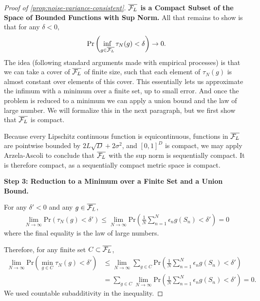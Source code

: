 \begin{proof}[Proof of \cref{prop:noise-variance-consistent}]
\textbf{$\overline{\mathcal{F}_L}$ is a Compact Subset of the Space of Bounded Functions with Sup Norm.}
All that remains to show is that for any $\delta < 0$,
\begin{align}
    \mathrm{Pr}\left(\inf_{g \in \overline{\mathcal{F}_L}} \tau_N(g) < \delta\right)  \to 0.
\end{align}
The idea (following standard arguments made with empirical processes) is that we can take a cover of $\overline{\mathcal{F}_L}$ of finite size, such that each element of $\tau_N(g)$ is almost constant over elements of this cover. This essentially lets us approximate the infimum with a minimum over a finite set, up to small error. And once the problem is reduced to a minimum we can apply a union bound and the law of large number. We will formalize this in the next paragraph, but we first show that $\overline{\mathcal{F}_L}$ is compact.

Because every Lipschitz continuous function is equicontinuous, functions in $\overline{\mathcal{F}_L}$ are pointwise bounded by $2L\sqrt{D}+ 2 \sigma^2$, and $[0,1]^D$ is compact, we may apply Arzela-Ascoli \citep[Theorem 7.25]{rudin_principles_1976} to conclude that $\overline{\mathcal{F}_L}$ with the sup norm is sequentially compact. It is therefore compact, as a sequentially compact metric space is compact. 

\textbf{Step 3: Reduction to a Minimum over a Finite Set and a Union Bound.}

For any $\delta' < 0$ and any $g \in \overline{\mathcal{F}_L}$, 
\begin{align}\label{eqn:lln-tau}
    \lim_{N \to \infty} \mathrm{Pr}(\tau_N(g) < \delta') \leq \lim_{N \to \infty} \mathrm{Pr}\left(\frac{1}{N}\sum_{n=1}^N \epsilon_n g(S_n) < \delta'\right) = 0 
\end{align} 
where the final equality is the law of large numbers. 

Therefore, for any finite set $C \subset \overline{\mathcal{F}_L}$, 
\begin{align}\label{eqn:finite-lln-tau}
    \lim_{N \to \infty} \mathrm{Pr}(\min_{g \in C} \tau_N(g) < \delta') &\leq \lim_{N \to \infty} \sum_{g \in C} \mathrm{Pr }\left(\frac{1}{N}\sum_{n=1}^N \epsilon_n g(S_n) < \delta'\right) \\
    & = \sum_{g \in C} \lim_{N \to \infty}  \mathrm{Pr}\left(\frac{1}{N}\sum_{n=1}^N \epsilon_n g(S_n) < \delta'\right) = 0.
\end{align} 
We used countable subadditivity in the inequality. 


\end{proof}
